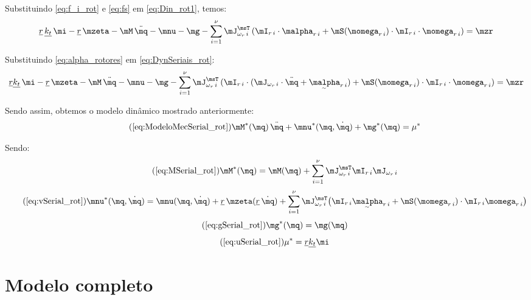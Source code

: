\documentclass[]{politex}
\begin{document}
Substituindo \eqref{eq:f_i_rot} e \eqref{eq:fs} em  \eqref{eq:Din_rot1}, temos:
\begin{equation} \label{eq:DynSeriais_rot}
\underline{r} \, \underline{k_t} \, \mi - \underline{r} \, \mzeta - \mM \, \ddot{\mq} - \mnu - \mg  - \sum_{i=1}^\nu \mJ_{\omega_r \,i}^\msT \, ( \mI_{r\,i} \cdot \malpha_{r\,i} + \mS( \momega_{r\,i} ) \cdot  \mI_{r\,i} \cdot \momega_{r\,i})    = \mzr
\end{equation}

Substituindo \eqref{eq:alpha_rotores} em \eqref{eq:DynSeriais_rot}:
\begin{equation} \label{eq:DynSeriais_rot2}
\underline{r} \underline{k_t} \, \mi - \underline{r} \, \mzeta  - \mM \, \ddot{\mq} - \mnu - \mg  - \sum_{i=1}^\nu \mJ_{\omega_r \,i}^\msT \, ( \mI_{r\,i} \cdot (\mJ_{\omega_r \,i}  \cdot \ddot{\mq} + \underaccent{\sim}{\malpha}_{r\,i}  ) + \mS( \momega_{r\,i} ) \cdot \mI_{r\,i} \cdot \momega_{r\,i}  )  = \mzr
\end{equation}

Sendo assim, obtemos o modelo dinâmico mostrado anteriormente:
\begin{equation} \tag{\ref{eq:ModeloMecSerial_rot}}
\mM^*(\mq)  \,\ddot{\mq} + \mnu^*(\mq,\dot{\mq}) + \mg^*(\mq) = \mu^*
\end{equation}

Sendo:
\begin{equation} \tag{\ref{eq:MSerial_rot}}
\mM^*(\mq) = \mM(\mq) + \sum_{i=1}^\nu \mJ_{\omega_r \,i}^\msT \mI_{r\,i} \mJ_{\omega_r \,i}
\end{equation}
\begin{equation} \tag{\ref{eq:vSerial_rot}}
\mnu^*(\mq, \dot{\mq}) = \mnu(\mq, \dot{\mq}) + \underline{r} \, \mzeta(\underline{r} \, \dot{\mq}) + \sum_{i=1}^\nu
 \mJ_{\omega_r \,i}^\msT \big( \mI_{r\,i} \underaccent{\sim}{\malpha}_{r\,i} + \mS( \momega_{r\,i} ) \cdot \mI_{r\,i} \momega_{r\,i} \big)
\end{equation}
\begin{equation} \tag{\ref{eq:gSerial_rot}}
\mg^*(\mq) = \mg(\mq)
\end{equation}
\begin{equation} \tag{\ref{eq:uSerial_rot}}
\mu^* = \underline{r} \underline{k_t} \mi
\end{equation}

\section{Modelo completo}
\end{document}
